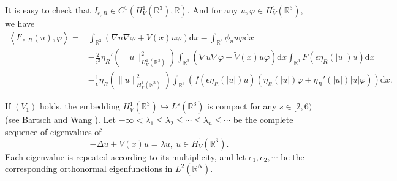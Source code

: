 \documentclass[12pt]{amsart}
\numberwithin{equation}{section}
\theoremstyle{definition}
\begin{document}
It is easy to check that $I_{\epsilon ,R }\in C^{1}\left ( H_{V}^{1}\left ( \mathbb{R}^{3} \right ) ,\mathbb{R}\right )$. And for any $u,\varphi \in H_{V}^{1}\left ( \mathbb{R}^{3} \right )$, we have
\begin{equation*}
    \begin{aligned}
		\left< I'_{\epsilon,R  }\left ( u \right ),\varphi \right>=& \int_{\mathbb{R}^{3}}\left ( \nabla u \nabla \varphi +V(x) u\varphi \right )\text{d}x-\int_{\mathbb{R}^{3}}\phi _{u}u\varphi \text{d}x\\
        &-\frac{2}{\epsilon^{2}}\eta _{R}'\left ( \|u\|^{2}_{H^1_{V}(\mathbb{R}^3)} \right )\int_{\mathbb{R}^{3}}(\nabla u\nabla\varphi+\tilde V(x)u\varphi) \text{d}x\int_{\mathbb{R}^{3}}F\left (\epsilon\eta _{R}\left ( \left | u\right | \right ) u\right )\text{d}x\\
        &-\frac{1}{\epsilon}\eta _{R}\left ( \|u\|^{2}_{H^1_{V}(\mathbb{R}^3)} \right )\int_{\mathbb{R}^{3}}\left(f\left (\epsilon \eta _{R}\left ( \left | u\right | \right ) u\right )\left (\eta _{R}\left ( \left | u\right | \right ) \varphi +\eta _{R}'\left ( \left | u\right |\right )|u|\varphi \right )\right)\text{d}x.
    \end{aligned}
\end{equation*}



If $(V_1)$ holds, %
the embedding $H^{1}_{V}(\mathbb{R}^3)\hookrightarrow L^{s}(\mathbb{R}^3)$ is compact for any $s\in[2,6)$ (see Bartsch and  Wang \cite{MR1349229}). %
Let $-\infty<\lambda_1\leq\lambda_2\leq\cdots\leq\lambda_{n}\leq\cdots$
be the complete sequence of eigenvalues of
\begin{equation*}
-\Delta u +V(x)u=\lambda u,\ u\in H^{1}_{V}(\mathbb{R}^3).
\end{equation*}
Each eigenvalue is repeated according to its multiplicity, and let $e_1,e_2,\cdots$ be the corresponding orthonormal eigenfunctions in $L^{2}(\mathbb{R}^N)$.
\end{document}
